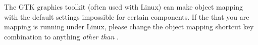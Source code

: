 % 
%
%

The GTK graphics toolkit (often used with Linux) can make object mapping with the default \gd{} settings impossible for certain components. If the \gdaut{} that you are mapping is running under Linux, please change the object mapping shortcut key combination to anything \emph{other than} .
